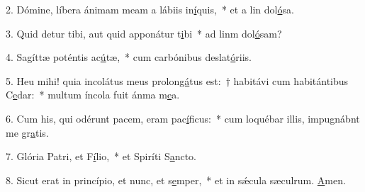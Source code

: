 2. Dómine, líbera ánimam meam a lábiis in\uline{í}quis,~* et a lin dol\uline{ó}sa.\par 
3. Quid detur tibi, aut quid apponátur t\uline{i}bi~* ad linm dol\uline{ó}sam?\par 
4. Sagíttæ poténtis ac\uline{ú}tæ,~* cum carbónibus deslat\uline{ó}riis.\par 
5. Heu mihi! quia incolátus meus prolon\uline{gá}tus est:~† habitávi cum habitántibus C\uline{e}dar:~* multum íncola fuit ánma m\uline{e}a.\par 
6. Cum his, qui odérunt pacem, eram pac\uline{í}ficus:~* cum loquébar illis, impugnábnt me gr\uline{a}tis.\par 
7. Glória Patri, et F\uline{í}lio,~* et Spiríti S\uline{a}ncto.\par 
8. Sicut erat in princípio, et nunc, et s\uline{e}mper,~* et in sǽcula sæculrum. \uline{A}men.\par 
